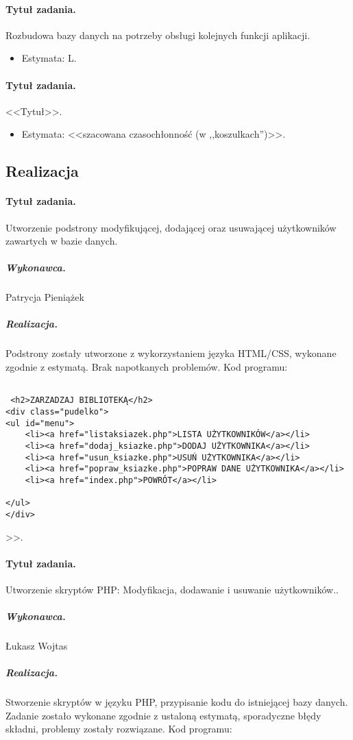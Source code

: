\documentclass[a4paper]{article}
\begin{document}
\paragraph{Tytuł zadania.} Rozbudowa bazy danych na potrzeby obsługi kolejnych funkcji aplikacji.
\begin{itemize}
\item Estymata: L.
\end{itemize}

\paragraph{Tytuł zadania.} <<Tytuł>>.
\begin{itemize}
\item Estymata: <<szacowana czasochłonność (w ,,koszulkach'')>>.
\end{itemize}
\subsection{Realizacja}


\paragraph{Tytuł zadania.}  Utworzenie podstrony modyfikującej, dodającej oraz usuwającej użytkowników zawartych w bazie danych.
\subparagraph{Wykonawca.} Patrycja Pieniążek 
\subparagraph{Realizacja.} Podstrony zostały utworzone z wykorzystaniem języka HTML/CSS, wykonane zgodnie z estymatą. Brak napotkanych problemów. Kod programu:
\begin{verbatim}

 <h2>ZARZADZAJ BIBLIOTEKĄ</h2>
<div class="pudelko">
<ul id="menu">
	<li><a href="listaksiazek.php">LISTA UŻYTKOWNIKÓW</a></li>
	<li><a href="dodaj_ksiazke.php">DODAJ UŻYTKOWNIKA</a></li>
	<li><a href="usun_ksiazke.php">USUŃ UŻYTKOWNIKA</a></li>
	<li><a href="popraw_ksiazke.php">POPRAW DANE UŻYTKOWNIKA</a></li>
	<li><a href="index.php">POWRÓT</a></li>

</ul>
</div>
\end{verbatim}>>.
\paragraph{Tytuł zadania.}  Utworzenie skryptów PHP: Modyfikacja, dodawanie i usuwanie użytkowników..
\subparagraph{Wykonawca.} Łukasz Wojtas
\subparagraph{Realizacja.} Stworzenie skryptów w języku PHP, przypisanie kodu do istniejącej bazy danych. Zadanie zostało wykonane zgodnie z ustaloną estymatą, sporadyczne błędy składni, problemy zostały rozwiązane. Kod programu:
\end{document}
